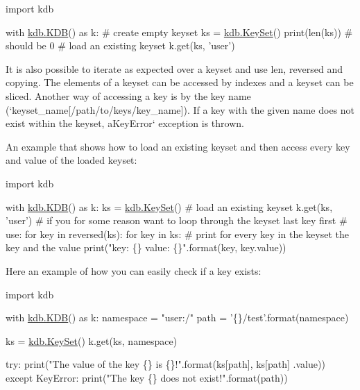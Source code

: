 \begin{DoxyCode}
\textcolor{keyword}{import} kdb

with \hyperlink{classkdb_1_1KDB}{kdb.KDB}() \textcolor{keyword}{as} k:
    \textcolor{comment}{# create empty keyset}
    ks = \hyperlink{classkdb_1_1KeySet}{kdb.KeySet}()
    print(len(ks))  \textcolor{comment}{# should be 0}
    \textcolor{comment}{# load an existing keyset}
    k.get(ks, \textcolor{stringliteral}{'user'})
\end{DoxyCode}


It is also possible to iterate as expected over a keyset and use {\ttfamily len}, {\ttfamily reversed} and copying. The elements of a keyset can be accessed by indexes and a keyset can be sliced. Another way of accessing a key is by the key name (`keyset\+\_\+name\mbox{[}\textquotesingle{}/path/to/keys/key\+\_\+name\textquotesingle{}\mbox{]}{\ttfamily ). If a key with the given name does not exist within the keyset, a}Key\+Error` exception is thrown.

An example that shows how to load an existing keyset and then access every key and value of the loaded keyset\+:


\begin{DoxyCode}
\textcolor{keyword}{import} kdb

with \hyperlink{classkdb_1_1KDB}{kdb.KDB}() \textcolor{keyword}{as} k:
    ks = \hyperlink{classkdb_1_1KeySet}{kdb.KeySet}()
    \textcolor{comment}{# load an existing keyset}
    k.get(ks, \textcolor{stringliteral}{'user'})
    \textcolor{comment}{# if you for some reason want to loop through the keyset last key first}
    \textcolor{comment}{# use: for key in reversed(ks):}
    \textcolor{keywordflow}{for} key \textcolor{keywordflow}{in} ks:
        \textcolor{comment}{# print for every key in the keyset the key and the value}
        print(\textcolor{stringliteral}{"key: \{\} value: \{\}"}.format(key, key.value))
\end{DoxyCode}


Here an example of how you can easily check if a key exists\+:


\begin{DoxyCode}
\textcolor{keyword}{import} kdb

with \hyperlink{classkdb_1_1KDB}{kdb.KDB}() \textcolor{keyword}{as} k:
    namespace = \textcolor{stringliteral}{"user:/"}
    path = \textcolor{stringliteral}{'\{\}/test'}.format(namespace)

    ks = \hyperlink{classkdb_1_1KeySet}{kdb.KeySet}()
    k.get(ks, namespace)

    \textcolor{keywordflow}{try}:
        print(\textcolor{stringliteral}{"The value of the key \{\} is \{\}!"}.format(ks[path], ks[path]
                                                      .value))
    \textcolor{keywordflow}{except} KeyError:
        print(\textcolor{stringliteral}{"The key \{\} does not exist!"}.format(path))
\end{DoxyCode}


